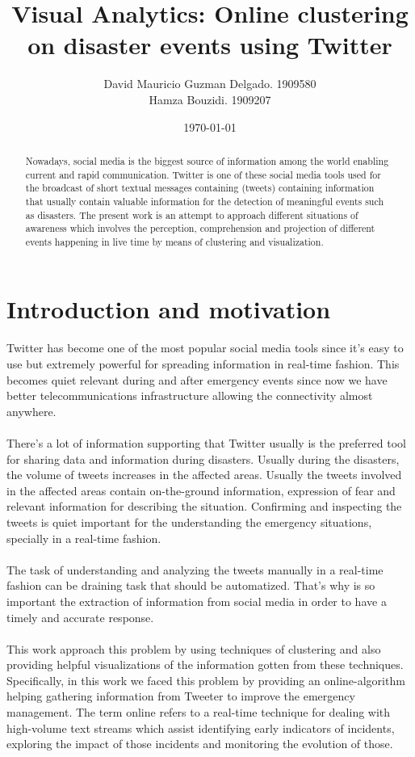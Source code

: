 \documentclass{article}
\title{Visual Analytics: Online clustering on disaster events using Twitter}
\author{David Mauricio Guzman Delgado. 1909580 \\
        Hamza Bouzidi. 1909207}
\date{\today}
\begin{document}
\maketitle

\begin{abstract}
Nowadays, social media is the biggest source of information among the world enabling current and rapid communication. Twitter is one of these social media tools used for the broadcast of short textual messages containing (tweets) containing information that usually contain valuable information for the detection of meaningful events such as  disasters. The present work is an attempt to approach different situations of awareness which involves the perception, comprehension and projection of different events happening in live time by means of clustering and visualization.
\end{abstract}
\section{Introduction and motivation}
Twitter has become one of the most popular social media tools since it's easy to use but extremely powerful for spreading information in real-time fashion. This becomes quiet relevant during and after emergency events since now we have better telecommunications infrastructure allowing the connectivity almost anywhere.
\\
\\
There's a lot of information supporting that Twitter usually is the preferred tool for sharing data and information during disasters. Usually during the disasters, the volume of tweets increases in the affected areas. Usually the tweets involved in the affected areas contain 
on-the-ground information, expression of fear and relevant information for describing the situation. Confirming and inspecting the tweets is quiet important for the understanding the emergency situations, specially in a real-time fashion.
\\
\\
The task of understanding and analyzing the tweets manually in a real-time fashion can be draining task that should be automatized. That's why is so important the extraction of information from social media in order to have a timely and accurate response.
\\
\\
This work approach this problem by using techniques of clustering and also providing helpful visualizations of the information gotten from these techniques. Specifically, in this work we faced this problem by providing an online-algorithm helping gathering information from Tweeter to improve the emergency management. The term online refers to a real-time technique for dealing with high-volume text streams which assist identifying early indicators of incidents, exploring the impact of those incidents and monitoring the evolution of those.
\end{document}
